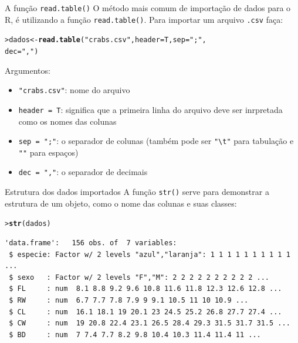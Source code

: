 \documentclass[10pt]{beamer}\usepackage{graphicx, color}
\makeatletter
\newcommand{\hlfunctioncall}[1]{\textcolor[rgb]{0,0,0.545098039215686}{\textbf{#1}}}%
\newcommand{\hlstring}[1]{\textcolor[rgb]{0.282352941176471,0.23921568627451,0.545098039215686}{#1}}%
\newenvironment{kframe}{%
 \def\at@end@of@kframe{}%
 \ifinner\ifhmode%
  \def\at@end@of@kframe{\end{minipage}}%
  \begin{minipage}{\columnwidth}%
 \fi\fi%
 \def\FrameCommand##1{\hskip\@totalleftmargin \hskip-\fboxsep
 \colorbox{shadecolor}{##1}\hskip-\fboxsep
     \hskip-\linewidth \hskip-\@totalleftmargin \hskip\columnwidth}%
 \MakeFramed {\advance\hsize-\width
   \@totalleftmargin\z@ \linewidth\hsize
   \@setminipage}}%
 {\par\unskip\endMakeFramed%
 \at@end@of@kframe}
\newenvironment{knitrout}{}{} %
\makeatother
\begin{document}
\begin{frame}[fragile=singleslide]{A função \texttt{read.table()}}
O método mais comum de importação de dados para o R, é utilizando a
função \texttt{read.table()}. Para importar um arquivo \texttt{.csv}
faça:
\begin{knitrout}\small
{}\color{fgcolor}\begin{kframe}
\begin{alltt}
> dados <- \hlfunctioncall{read.table}(\hlstring{"crabs.csv"}, header = T, sep = \hlstring{";"},
                      dec = \hlstring{","})
\end{alltt}
\end{kframe}
\end{knitrout}

Argumentos:
\begin{itemize}
\item \verb|"crabs.csv"|: nome do arquivo
\item \texttt{header = T}: significa que a primeira linha do arquivo deve
  ser inrpretada como os nomes das colunas
\item \texttt{sep = ";"}: o separador de colunas (também pode ser
  \verb|"\t"| para tabulação e \verb|""| para espaços)
\item \texttt{dec = ","}: o separador de decimais
\end{itemize}
\end{frame}

\begin{frame}[fragile=singleslide]{Estrutura dos dados importados}
A função \texttt{str()} serve para demonstrar a estrutura de um objeto,
como o nome das colunas e suas classes:
\begin{knitrout}\small
{}\color{fgcolor}\begin{kframe}
\begin{alltt}
> \hlfunctioncall{str}(dados)
\end{alltt}
\begin{verbatim}
'data.frame':	156 obs. of  7 variables:
 $ especie: Factor w/ 2 levels "azul","laranja": 1 1 1 1 1 1 1 1 1 1 ...
 $ sexo   : Factor w/ 2 levels "F","M": 2 2 2 2 2 2 2 2 2 2 ...
 $ FL     : num  8.1 8.8 9.2 9.6 10.8 11.6 11.8 12.3 12.6 12.8 ...
 $ RW     : num  6.7 7.7 7.8 7.9 9 9.1 10.5 11 10 10.9 ...
 $ CL     : num  16.1 18.1 19 20.1 23 24.5 25.2 26.8 27.7 27.4 ...
 $ CW     : num  19 20.8 22.4 23.1 26.5 28.4 29.3 31.5 31.7 31.5 ...
 $ BD     : num  7 7.4 7.7 8.2 9.8 10.4 10.3 11.4 11.4 11 ...
\end{verbatim}
\end{kframe}
\end{knitrout}

\end{frame}
\end{document}
